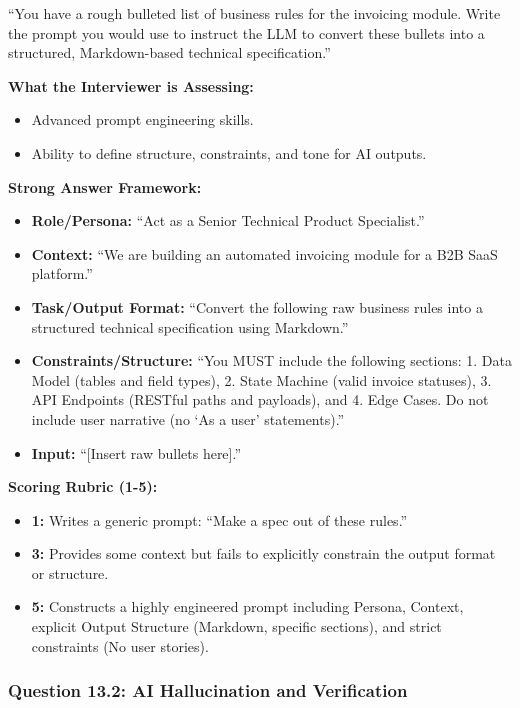 ``You have a rough bulleted list of business rules for the invoicing
module. Write the prompt you would use to instruct the LLM to convert
these bullets into a structured, Markdown-based technical
specification.''

\textbf{What the Interviewer is Assessing:}

\begin{itemize}
\tightlist
\item
  Advanced prompt engineering skills.
\item
  Ability to define structure, constraints, and tone for AI outputs.
\end{itemize}

\textbf{Strong Answer Framework:}

\begin{itemize}
\tightlist
\item
  \textbf{Role/Persona:} ``Act as a Senior Technical Product
  Specialist.''
\item
  \textbf{Context:} ``We are building an automated invoicing module for
  a B2B SaaS platform.''
\item
  \textbf{Task/Output Format:} ``Convert the following raw business
  rules into a structured technical specification using Markdown.''
\item
  \textbf{Constraints/Structure:} ``You MUST include the following
  sections: 1. Data Model (tables and field types), 2. State Machine
  (valid invoice statuses), 3. API Endpoints (RESTful paths and
  payloads), and 4. Edge Cases. Do not include user narrative (no `As a
  user' statements).''
\item
  \textbf{Input:} ``{[}Insert raw bullets here{]}.''
\end{itemize}

\textbf{Scoring Rubric (1-5):}

\begin{itemize}
\tightlist
\item
  \textbf{1:} Writes a generic prompt: ``Make a spec out of these
  rules.''
\item
  \textbf{3:} Provides some context but fails to explicitly constrain
  the output format or structure.
\item
  \textbf{5:} Constructs a highly engineered prompt including Persona,
  Context, explicit Output Structure (Markdown, specific sections), and
  strict constraints (No user stories).
\end{itemize}

\subsubsection{Question 13.2: AI Hallucination and
Verification}\label{question-13.2-ai-hallucination-and-verification}

